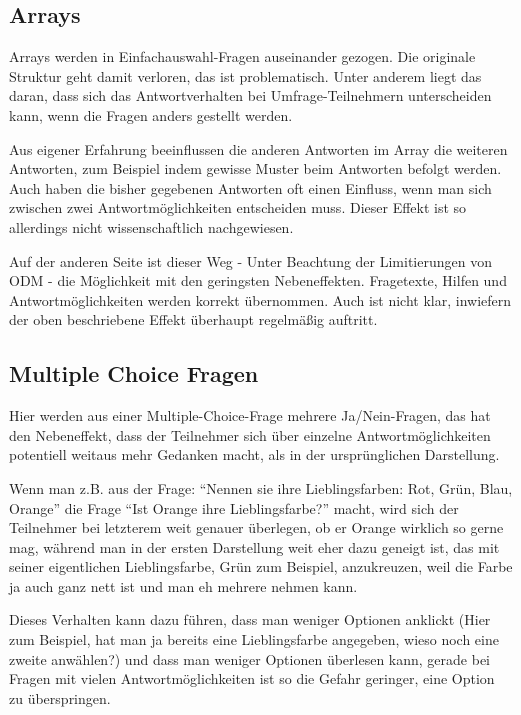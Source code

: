 \subsection{Arrays}

Arrays werden in Einfachauswahl-Fragen auseinander gezogen.
Die originale Struktur geht damit verloren, das ist problematisch.
Unter anderem liegt das daran, dass sich das Antwortverhalten bei Umfrage-Teilnehmern unterscheiden kann, wenn die Fragen anders gestellt werden.

Aus eigener Erfahrung beeinflussen die anderen Antworten im Array die weiteren Antworten, zum Beispiel indem gewisse Muster beim Antworten befolgt werden.
Auch haben die bisher gegebenen Antworten oft einen Einfluss, wenn man sich zwischen zwei Antwortmöglichkeiten entscheiden muss.
Dieser Effekt ist so allerdings nicht wissenschaftlich nachgewiesen.

Auf der anderen Seite ist dieser Weg - Unter Beachtung der Limitierungen von ODM - die Möglichkeit mit den geringsten Nebeneffekten.
Fragetexte, Hilfen und Antwortmöglichkeiten werden korrekt übernommen.
Auch ist nicht klar, inwiefern der oben beschriebene Effekt überhaupt regelmäßig auftritt.

\subsection{Multiple Choice Fragen}

Hier werden aus einer Multiple-Choice-Frage mehrere Ja/Nein-Fragen, das hat den Nebeneffekt, dass der Teilnehmer sich über einzelne Antwortmöglichkeiten potentiell weitaus mehr Gedanken macht, als in der ursprünglichen Darstellung.

Wenn man z.B. aus der Frage: \enquote{Nennen sie ihre Lieblingsfarben: Rot, Grün, Blau, Orange} die Frage \enquote{Ist Orange ihre Lieblingsfarbe?} macht, 
wird sich der Teilnehmer bei letzterem weit genauer überlegen, ob er Orange wirklich so gerne mag, während man in der ersten Darstellung weit eher dazu geneigt ist, 
das mit seiner eigentlichen Lieblingsfarbe, Grün zum Beispiel, anzukreuzen, weil die Farbe ja auch ganz nett ist und man eh mehrere nehmen kann.

Dieses Verhalten kann dazu führen, dass man weniger Optionen anklickt (Hier zum Beispiel, hat man ja bereits eine Lieblingsfarbe angegeben, wieso noch eine zweite anwählen?)
und dass man weniger Optionen überlesen kann, gerade bei Fragen mit vielen Antwortmöglichkeiten ist so die Gefahr geringer, eine Option zu überspringen.

